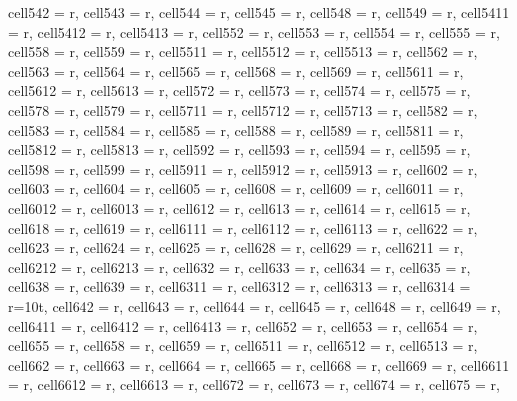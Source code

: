 \begin{landscape}
\begin{longtblr}[
  caption = {Changes in average values and effects differences significance from post hoc analysis.},
  label = {tab:appendix_LCBM_all_results_post_hocs}
]
{  cell{54}{2} = {r},
  cell{54}{3} = {r},
  cell{54}{4} = {r},
  cell{54}{5} = {r},
  cell{54}{8} = {r},
  cell{54}{9} = {r},
  cell{54}{11} = {r},
  cell{54}{12} = {r},
  cell{54}{13} = {r},
  cell{55}{2} = {r},
  cell{55}{3} = {r},
  cell{55}{4} = {r},
  cell{55}{5} = {r},
  cell{55}{8} = {r},
  cell{55}{9} = {r},
  cell{55}{11} = {r},
  cell{55}{12} = {r},
  cell{55}{13} = {r},
  cell{56}{2} = {r},
  cell{56}{3} = {r},
  cell{56}{4} = {r},
  cell{56}{5} = {r},
  cell{56}{8} = {r},
  cell{56}{9} = {r},
  cell{56}{11} = {r},
  cell{56}{12} = {r},
  cell{56}{13} = {r},
  cell{57}{2} = {r},
  cell{57}{3} = {r},
  cell{57}{4} = {r},
  cell{57}{5} = {r},
  cell{57}{8} = {r},
  cell{57}{9} = {r},
  cell{57}{11} = {r},
  cell{57}{12} = {r},
  cell{57}{13} = {r},
  cell{58}{2} = {r},
  cell{58}{3} = {r},
  cell{58}{4} = {r},
  cell{58}{5} = {r},
  cell{58}{8} = {r},
  cell{58}{9} = {r},
  cell{58}{11} = {r},
  cell{58}{12} = {r},
  cell{58}{13} = {r},
  cell{59}{2} = {r},
  cell{59}{3} = {r},
  cell{59}{4} = {r},
  cell{59}{5} = {r},
  cell{59}{8} = {r},
  cell{59}{9} = {r},
  cell{59}{11} = {r},
  cell{59}{12} = {r},
  cell{59}{13} = {r},
  cell{60}{2} = {r},
  cell{60}{3} = {r},
  cell{60}{4} = {r},
  cell{60}{5} = {r},
  cell{60}{8} = {r},
  cell{60}{9} = {r},
  cell{60}{11} = {r},
  cell{60}{12} = {r},
  cell{60}{13} = {r},
  cell{61}{2} = {r},
  cell{61}{3} = {r},
  cell{61}{4} = {r},
  cell{61}{5} = {r},
  cell{61}{8} = {r},
  cell{61}{9} = {r},
  cell{61}{11} = {r},
  cell{61}{12} = {r},
  cell{61}{13} = {r},
  cell{62}{2} = {r},
  cell{62}{3} = {r},
  cell{62}{4} = {r},
  cell{62}{5} = {r},
  cell{62}{8} = {r},
  cell{62}{9} = {r},
  cell{62}{11} = {r},
  cell{62}{12} = {r},
  cell{62}{13} = {r},
  cell{63}{2} = {r},
  cell{63}{3} = {r},
  cell{63}{4} = {r},
  cell{63}{5} = {r},
  cell{63}{8} = {r},
  cell{63}{9} = {r},
  cell{63}{11} = {r},
  cell{63}{12} = {r},
  cell{63}{13} = {r},
  cell{63}{14} = {r=10}{t},
  cell{64}{2} = {r},
  cell{64}{3} = {r},
  cell{64}{4} = {r},
  cell{64}{5} = {r},
  cell{64}{8} = {r},
  cell{64}{9} = {r},
  cell{64}{11} = {r},
  cell{64}{12} = {r},
  cell{64}{13} = {r},
  cell{65}{2} = {r},
  cell{65}{3} = {r},
  cell{65}{4} = {r},
  cell{65}{5} = {r},
  cell{65}{8} = {r},
  cell{65}{9} = {r},
  cell{65}{11} = {r},
  cell{65}{12} = {r},
  cell{65}{13} = {r},
  cell{66}{2} = {r},
  cell{66}{3} = {r},
  cell{66}{4} = {r},
  cell{66}{5} = {r},
  cell{66}{8} = {r},
  cell{66}{9} = {r},
  cell{66}{11} = {r},
  cell{66}{12} = {r},
  cell{66}{13} = {r},
  cell{67}{2} = {r},
  cell{67}{3} = {r},
  cell{67}{4} = {r},
  cell{67}{5} = {r},
}
\end{longtblr}
\end{landscape}
